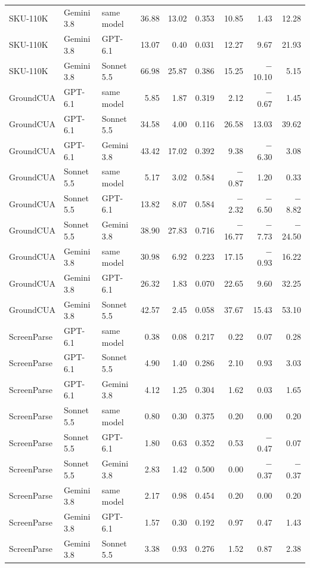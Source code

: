 {\begin{longtable}{@{}lllrrrrrr@{}}
SKU-110K & Gemini 3.8 & same model & 36.88 & 13.02 & 0.353 & 10.85 & 1.43 & 12.28 \\
SKU-110K & Gemini 3.8 & GPT-6.1 & 13.07 & 0.40 & 0.031 & 12.27 & 9.67 & 21.93 \\
SKU-110K & Gemini 3.8 & Sonnet 5.5 & 66.98 & 25.87 & 0.386 & 15.25 & $-$10.10 & 5.15 \\
\midrule
GroundCUA & GPT-6.1 & same model & 5.85 & 1.87 & 0.319 & 2.12 & $-$0.67 & 1.45 \\
GroundCUA & GPT-6.1 & Sonnet 5.5 & 34.58 & 4.00 & 0.116 & 26.58 & 13.03 & 39.62 \\
GroundCUA & GPT-6.1 & Gemini 3.8 & 43.42 & 17.02 & 0.392 & 9.38 & $-$6.30 & 3.08 \\
GroundCUA & Sonnet 5.5 & same model & 5.17 & 3.02 & 0.584 & $-$0.87 & 1.20 & 0.33 \\
GroundCUA & Sonnet 5.5 & GPT-6.1 & 13.82 & 8.07 & 0.584 & $-$2.32 & $-$6.50 & $-$8.82 \\
GroundCUA & Sonnet 5.5 & Gemini 3.8 & 38.90 & 27.83 & 0.716 & $-$16.77 & $-$7.73 & $-$24.50 \\
GroundCUA & Gemini 3.8 & same model & 30.98 & 6.92 & 0.223 & 17.15 & $-$0.93 & 16.22 \\
GroundCUA & Gemini 3.8 & GPT-6.1 & 26.32 & 1.83 & 0.070 & 22.65 & 9.60 & 32.25 \\
GroundCUA & Gemini 3.8 & Sonnet 5.5 & 42.57 & 2.45 & 0.058 & 37.67 & 15.43 & 53.10 \\
\midrule
ScreenParse & GPT-6.1 & same model & 0.38 & 0.08 & 0.217 & 0.22 & 0.07 & 0.28 \\
ScreenParse & GPT-6.1 & Sonnet 5.5 & 4.90 & 1.40 & 0.286 & 2.10 & 0.93 & 3.03 \\
ScreenParse & GPT-6.1 & Gemini 3.8 & 4.12 & 1.25 & 0.304 & 1.62 & 0.03 & 1.65 \\
ScreenParse & Sonnet 5.5 & same model & 0.80 & 0.30 & 0.375 & 0.20 & 0.00 & 0.20 \\
ScreenParse & Sonnet 5.5 & GPT-6.1 & 1.80 & 0.63 & 0.352 & 0.53 & $-$0.47 & 0.07 \\
ScreenParse & Sonnet 5.5 & Gemini 3.8 & 2.83 & 1.42 & 0.500 & 0.00 & $-$0.37 & $-$0.37 \\
ScreenParse & Gemini 3.8 & same model & 2.17 & 0.98 & 0.454 & 0.20 & 0.00 & 0.20 \\
ScreenParse & Gemini 3.8 & GPT-6.1 & 1.57 & 0.30 & 0.192 & 0.97 & 0.47 & 1.43 \\
ScreenParse & Gemini 3.8 & Sonnet 5.5 & 3.38 & 0.93 & 0.276 & 1.52 & 0.87 & 2.38 \\
\end{longtable}}
